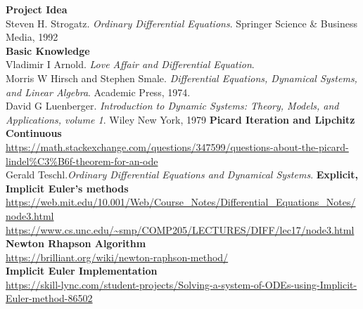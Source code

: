 \documentclass[a4paper]{article}
\begin{document}

% 
\begin{thebibliography}{90}
 \textbf{Project Idea}\\ 
Steven H. Strogatz. \emph {Ordinary Differential Equations}. Springer Science & Business Media, 1992\\
 \textbf{Basic Knowledge}\\
Vladimir I Arnold. \emph {Love Affair and Differential Equation}. \\
Morris W Hirsch and Stephen Smale. \emph {Differential Equations, Dynamical Systems, and Linear Algebra}. Academic Press, 1974.\\
David G Luenberger. \emph {Introduction to Dynamic Systems: Theory, Models, and Applications, volume 1}. Wiley New York, 1979
 \textbf{Picard Iteration and Lipchitz Continuous}\\
\url{https://math.stackexchange.com/questions/347599/questions-about-the-picard-lindel%C3%B6f-theorem-for-an-ode}\\
Gerald Teschl.\emph {Ordinary Differential Equations
and Dynamical Systems}. 
 \textbf{Explicit, Implicit Euler's methods}\\ \url{https://web.mit.edu/10.001/Web/Course_Notes/Differential_Equations_Notes/node3.html}\\
\url{https://www.cs.unc.edu/~smp/COMP205/LECTURES/DIFF/lec17/node3.html} \\

 \textbf{Newton Rhapson Algorithm}\\ \url{https://brilliant.org/wiki/newton-raphson-method/}\\

 \textbf{Implicit Euler Implementation}\\ \url{https://skill-lync.com/student-projects/Solving-a-system-of-ODEs-using-Implicit-Euler-method-86502}
\end{thebibliography}
\end{document}
